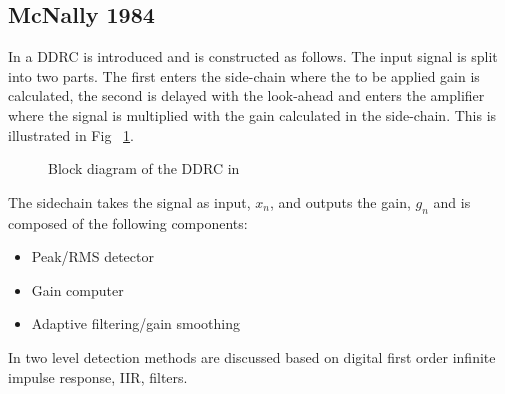 \documentclass[../main2.tex]{subfiles}
\providecommand{\rootdir}{..}
\begin{document}
\subsection{McNally 1984}
In \cite{mcnally1984dynamic} a DDRC is introduced and is constructed as follows. The input signal is split into two parts. The first enters the side-chain where the to be applied gain is calculated, the second is delayed with the look-ahead and enters the amplifier where the signal is multiplied with the gain calculated in the side-chain. This is illustrated in Fig ~\ref{fig:block_mcnally_theory1}. %
\begin{figure}
\centerline{}
\caption{Block diagram of the DDRC in \cite{mcnally1984dynamic}}
\label{fig:block_mcnally_theory1}
\end{figure}

The sidechain takes the signal as input, $x_n$, and outputs the gain, $g_n$ and is composed of the following components:%
\begin{itemize}
\item{Peak/RMS detector}
\item{Gain computer}
\item{Adaptive filtering/gain smoothing}
\end{itemize}
In \cite{mcnally1984dynamic} two level detection methods are discussed based on digital first order infinite impulse response, IIR, filters.
\end{document}

